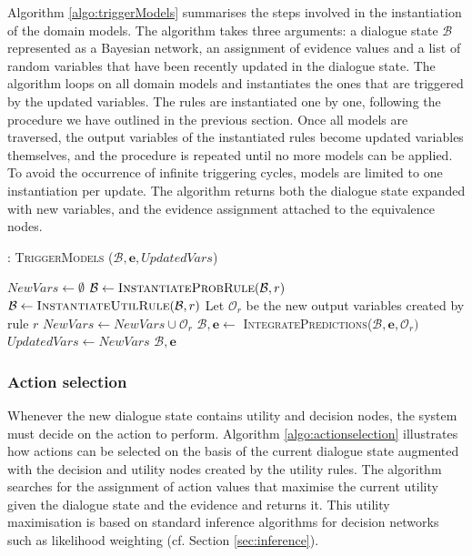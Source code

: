 Algorithm \ref{algo:triggerModels} summarises the steps involved in the instantiation of the domain models. The algorithm takes three arguments: a dialogue state $\mathcal{B}$ represented as a Bayesian network, an assignment of evidence values and a list of random variables that have been recently updated in the dialogue state. The algorithm loops on all domain models and instantiates the ones that are triggered by the updated variables. The rules are instantiated one by one, following the procedure we have outlined in the previous section. Once all models are traversed, the output variables of the instantiated rules become updated variables themselves, and the procedure is repeated until no more models can be applied.  To avoid the occurrence of infinite triggering cycles, models are limited to one instantiation per update. The algorithm returns both the dialogue state expanded with new variables, and the evidence assignment attached to the equivalence nodes. 


\begin{algorithm}[h]
\caption{: \textsc{TriggerModels} ($\mathcal{B}, \mathbf{e}, \mathit{UpdatedVars}$)}
\begin{algorithmic}[1] \vspace{1mm}
\STATE $\mathit{NewVars} \leftarrow \emptyset$
\STATE $\mathcal{B} \leftarrow \textsc{InstantiateProbRule}(\mathcal{B},r)$
\STATE $\mathcal{B} \leftarrow \textsc{InstantiateUtilRule}(\mathcal{B},r)$
\ENDIF
\STATE Let $\mathcal{O}_r$ be the new output variables created by rule $r$
\STATE $\mathit{NewVars} \leftarrow \mathit{NewVars} \cup \mathcal{O}_r$
\STATE $\mathcal{B}, \mathbf{e} \leftarrow $ \textsc{IntegratePredictions}($\mathcal{B}, \mathbf{e}, \mathcal{O}_r)$
\ENDFOR
\ENDIF
\ENDFOR 
\STATE $\mathit{UpdatedVars} \leftarrow \mathit{NewVars}$
\ENDWHILE 
\RETURN $\mathcal{B}, \mathbf{e}$
\end{algorithmic}
\label{algo:triggerModels}
\end{algorithm}


\subsubsection*{Action selection}

Whenever the new dialogue state contains utility and decision nodes, the system must decide on the action to perform.  Algorithm \ref{algo:actionselection} illustrates how actions can be selected on the basis of the current dialogue state augmented with the decision and utility nodes created by the utility rules. The algorithm searches for the assignment of action values that maximise the current utility given the dialogue state and the evidence and returns it. This utility maximisation is based on standard inference algorithms for decision networks such as likelihood weighting (cf. Section \ref{sec:inference}). 

